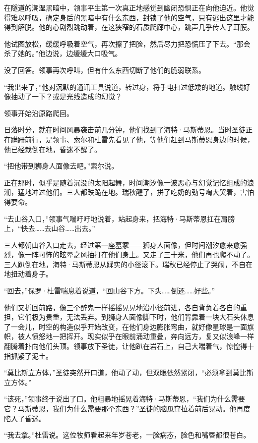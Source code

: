 \documentclass[AutoFakeBold=true]{book}
\begin{document}
在隧道的潮湿黑暗中，领事平生第一次真正地感觉到幽闭恐惧正在向他迫近。他觉得难以呼吸，确定身后的黑暗中有什么东西，封锁了他的空气，只有逃出这里才能得到解脱。他的心剧烈跳动着，在这狭窄的石质爬廊中心，跳声几乎传人了耳膜。

他试图放松，缓缓呼吸着空气，再次擦了把脸，然后尽力把恐慌压了下去。``那会杀了她的。''他边说，边缓缓大口吸气。

没了回答。领事再次呼叫，但有什么东西切断了他们的脆弱联系。

``我出来了，''他对沉默的通讯工具说道，转过身，将手电扫过低矮的地道。{\kaishu 触线好像抽动了一下？或是光线造成的幻觉？}

领事开始沿原路爬回。

\vspace*{1em}

日落时分，就在时间风暴袭击前几分钟，他们找到了海特·马斯蒂恩。当时圣徒正在蹒跚前行，是领事、索尔和杜雷先看见了他，等他们赶到马斯蒂恩身边的时候，他已经栽倒在地，昏迷不醒了。

``把他带到狮身人面像去吧。''索尔说。

正在那时，似乎是随着沉没的太阳起舞，时间潮汐像一波恶心与{\kaishu 幻觉记忆}组成的浪潮，猛地冲过他们。三人都跌跪在地。瑞秋醒了，拼了吃奶的劲号啕大哭着，害怕得要命。

``去山谷入口，''领事气喘吁吁地说着，站起身来，把海特·马斯蒂恩扛在肩膀上，``快去……去山谷……出去。''

三人都朝山谷入口走去，经过第一座墓冢——狮身人面像，但时间潮汐愈来愈强烈，像一阵可怖的眩晕之风抽打在他们身上。又走了三十米，他们再也爬不动了。三人趴倒在地，海特·马斯蒂恩从踩实的小径滚下。瑞秋已经停止了哭闹，不自在地扭动着身子。

``回去，''保罗·杜雷喘息着说道，``回山谷下方。下头……倒还……好些。''

他们又折回前路，像三个醉鬼一样摇摇晃晃地沿小径前进，各自背负着各自的重担，它们极为贵重，无法丢弃。到狮身人面像脚下时，他们背靠着一块大石头休息了一会儿，时空的构造似乎开始改变，在他们身边膨胀弯曲，就好像星球是一面旗帜，被人愤怒地一把挥开。现实似乎在眼前涌动重叠，奔向远方，复又似浪峰一样翻腾着扑向他们头顶。领事放下圣徒，让他趴在岩石上，自己大喘着气，惊惶得十指抓紧了泥土。

``莫比斯立方体，''圣徒突然开口道，他动了动，但双眼依然紧闭，``必须拿到莫比斯立方体。''

``该死，''领事终于说出了口。他粗暴地摇晃着海特·马斯蒂恩，``我们为什么需要它？马斯蒂恩，我们为什么需要那个东西？''圣徒的脑瓜耷拉着前后晃动。他再度陷入了昏迷。

``我去拿。''杜雷说。这位牧师看起来年岁苍老，一脸病态，脸色和嘴唇都很苍白。
\end{document}
